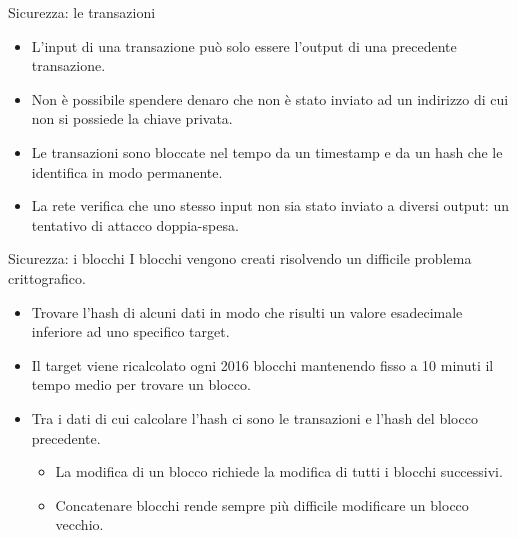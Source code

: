 \documentclass[italian]{beamer}
\begin{document}
\begin{frame}{Sicurezza: le transazioni}
\begin{itemize}
    \item L'input di una transazione può solo essere l'output di una precedente transazione.
    \item Non è possibile spendere denaro che non è stato inviato ad un indirizzo di cui non si possiede la chiave privata.
    \item Le transazioni sono bloccate nel tempo da un timestamp e da un hash che le identifica in modo permanente.
    \item La rete verifica che uno stesso input non sia stato inviato a diversi output: un tentativo di attacco doppia-spesa.
\end{itemize}
\end{frame}

\begin{frame}{Sicurezza: i blocchi}
I blocchi vengono creati risolvendo un difficile problema crittografico.
\begin{itemize}
  \item Trovare l'hash di alcuni dati in modo che risulti un valore esadecimale inferiore ad uno specifico target.
  \item Il target viene ricalcolato ogni 2016 blocchi mantenendo fisso a 10 minuti il tempo medio per trovare un blocco.
  \item Tra i dati di cui calcolare l'hash ci sono le transazioni e l'hash del blocco precedente.
  \begin{itemize}
    \item La modifica di un blocco richiede la modifica di tutti i blocchi successivi.
    \item Concatenare blocchi rende sempre più difficile modificare un blocco vecchio.
  \end{itemize}
\end{itemize}
\end{frame}

\end{document}
